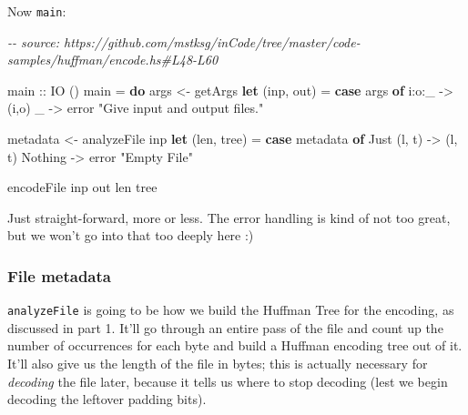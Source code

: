 \documentclass[]{article}
\newenvironment{Shaded}{}{}
\newcommand{\CommentTok}[1]{\textcolor[rgb]{0.38,0.63,0.69}{\textit{#1}}}
\newcommand{\DataTypeTok}[1]{\textcolor[rgb]{0.56,0.13,0.00}{#1}}
\newcommand{\FunctionTok}[1]{\textcolor[rgb]{0.02,0.16,0.49}{#1}}
\newcommand{\KeywordTok}[1]{\textcolor[rgb]{0.00,0.44,0.13}{\textbf{#1}}}
\newcommand{\NormalTok}[1]{#1}
\newcommand{\OperatorTok}[1]{\textcolor[rgb]{0.40,0.40,0.40}{#1}}
\newcommand{\OtherTok}[1]{\textcolor[rgb]{0.00,0.44,0.13}{#1}}
\newcommand{\StringTok}[1]{\textcolor[rgb]{0.25,0.44,0.63}{#1}}
\begin{document}
Now \texttt{main}:

\begin{Shaded}
\begin{Highlighting}[]
\CommentTok{{-}{-} source: https://github.com/mstksg/inCode/tree/master/code{-}samples/huffman/encode.hs\#L48{-}L60}

\OtherTok{main ::} \DataTypeTok{IO}\NormalTok{ ()}
\NormalTok{main }\OtherTok{=} \KeywordTok{do}
\NormalTok{    args     }\OtherTok{<{-}}\NormalTok{ getArgs}
    \KeywordTok{let}\NormalTok{ (inp, out)  }\OtherTok{=} \KeywordTok{case}\NormalTok{ args }\KeywordTok{of}
\NormalTok{                        i}\OperatorTok{:}\NormalTok{o}\OperatorTok{:}\NormalTok{\_      }\OtherTok{{-}>}\NormalTok{ (i,o)}
\NormalTok{                        \_          }\OtherTok{{-}>} \FunctionTok{error} \StringTok{"Give input and output files."}

\NormalTok{    metadata }\OtherTok{<{-}}\NormalTok{ analyzeFile inp}
    \KeywordTok{let}\NormalTok{ (len, tree) }\OtherTok{=} \KeywordTok{case}\NormalTok{ metadata }\KeywordTok{of}
                        \DataTypeTok{Just}\NormalTok{ (l, t) }\OtherTok{{-}>}\NormalTok{ (l, t)}
                        \DataTypeTok{Nothing}     \OtherTok{{-}>} \FunctionTok{error} \StringTok{"Empty File"}

\NormalTok{    encodeFile inp out len tree}
\end{Highlighting}
\end{Shaded}

Just straight-forward, more or less. The error handling is kind of not too
great, but we won't go into that too deeply here :)

\hypertarget{file-metadata}{%
\subsubsection{File metadata}\label{file-metadata}}

\texttt{analyzeFile} is going to be how we build the Huffman Tree for the
encoding, as discussed in part 1. It'll go through an entire pass of the file
and count up the number of occurrences for each byte and build a Huffman
encoding tree out of it. It'll also give us the length of the file in bytes;
this is actually necessary for \emph{decoding} the file later, because it tells
us where to stop decoding (lest we begin decoding the leftover padding bits).
\end{document}
